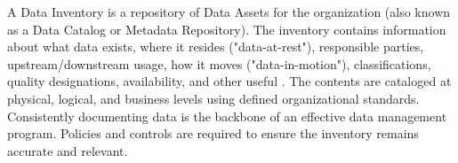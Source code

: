 %
%
A Data Inventory is a repository of Data Assets for the organization
(also known as a Data Catalog or Metadata Repository).
The inventory contains information about what data exists, where it resides ("data-at-rest"),
responsible parties, upstream/downstream usage, how it moves ("data-in-motion"),
classifications, quality designations,
availability, and other useful .
The contents are cataloged at physical, logical, and business levels using defined organizational standards.
Consistently documenting data is the backbone of an effective data management program.
Policies and controls are required to ensure the inventory remains accurate and relevant.

